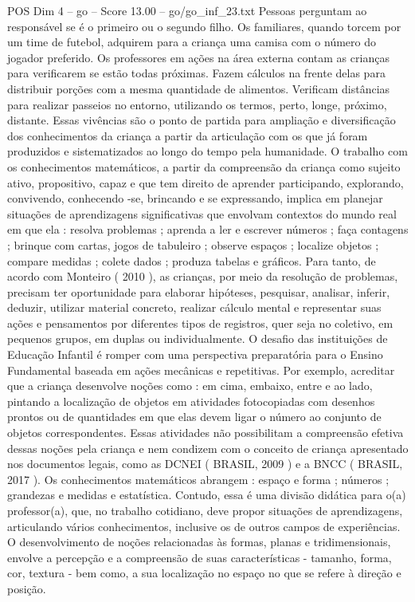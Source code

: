 \begin{textsample}{POS Dim 4 – go – Score 13.00 – go/go\_inf\_23.txt}
Pessoas perguntam ao responsável se é o primeiro ou o segundo filho.
Os familiares, quando torcem por um time de futebol, adquirem para a criança uma camisa com o número do jogador preferido.
Os professores em ações na área externa contam as crianças para verificarem se estão todas próximas.
Fazem cálculos na frente delas para distribuir porções com a mesma quantidade de alimentos.
Verificam distâncias para realizar passeios no entorno, utilizando os termos, perto, longe, próximo, distante.
Essas vivências são o ponto de partida para ampliação e diversificação dos conhecimentos da criança a partir da articulação com os que já foram produzidos e sistematizados ao longo do tempo pela humanidade.
O trabalho com os conhecimentos matemáticos, a partir da compreensão da criança como sujeito ativo, propositivo, capaz e que tem direito de aprender participando, explorando, convivendo, conhecendo -se, brincando e se expressando, implica em planejar situações de aprendizagens significativas que envolvam contextos do mundo real em que ela : resolva problemas ; aprenda a ler e escrever números ; faça contagens ; brinque com cartas, jogos de tabuleiro ; observe espaços ; localize objetos ; compare medidas ; colete dados ; produza tabelas e gráficos.
Para tanto, de acordo com Monteiro ( 2010 ), as crianças, por meio da resolução de problemas, precisam ter oportunidade para elaborar hipóteses, pesquisar, analisar, inferir, deduzir, utilizar material concreto, realizar cálculo mental e representar suas ações e pensamentos por diferentes tipos de registros, quer seja no coletivo, em pequenos grupos, em duplas ou individualmente.
O desafio das instituições de Educação Infantil é romper com uma perspectiva preparatória para o Ensino Fundamental baseada em ações mecânicas e repetitivas.
Por exemplo, acreditar que a criança desenvolve noções como : em cima, embaixo, entre e ao lado, pintando a localização de objetos em atividades fotocopiadas com desenhos prontos ou de quantidades em que elas devem ligar o número ao conjunto de objetos correspondentes.
Essas atividades não possibilitam a compreensão efetiva dessas noções pela criança e nem condizem com o conceito de criança apresentado nos documentos legais, como as DCNEI ( BRASIL, 2009 ) e a BNCC ( BRASIL, 2017 ).
Os conhecimentos matemáticos abrangem : espaço e forma ; números ; grandezas e medidas e estatística.
Contudo, essa é uma divisão didática para o(a) professor(a), que, no trabalho cotidiano, deve propor situações de aprendizagens, articulando vários conhecimentos, inclusive os de outros campos de experiências.
O desenvolvimento de noções relacionadas às formas, planas e tridimensionais, envolve a percepção e a compreensão de suas características - tamanho, forma, cor, textura - bem como, a sua localização no espaço no que se refere à direção e posição.

\end{textsample}

